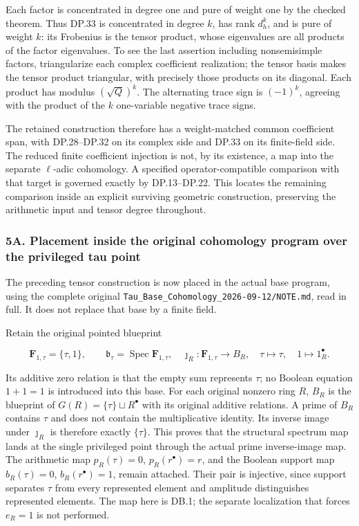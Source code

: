 Each factor is concentrated in degree one and pure of weight one by the checked theorem. Thus DP.33 is concentrated in degree \(k\), has rank \(d_h^k\), and is pure of weight \(k\): its Frobenius is the tensor product, whose eigenvalues are all products of the factor eigenvalues. To see the last assertion including nonsemisimple factors, triangularize each complex coefficient realization; the tensor basis makes the tensor product triangular, with precisely those products on its diagonal. Each product has modulus \((\sqrt Q)^k\). The alternating trace sign is \((-1)^k\), agreeing with the product of the \(k\) one-variable negative trace signs.

The retained construction therefore has a weight-matched common coefficient span, with DP.28--DP.32 on its complex side and DP.33 on its finite-field side. The reduced finite coefficient injection is not, by its existence, a map into the separate \(\ell\)-adic cohomology. A specified operator-compatible comparison with that target is governed exactly by DP.13--DP.22. This locates the remaining comparison inside an explicit surviving geometric construction, preserving the arithmetic input and tensor degree throughout.

\subsubsection{5A. Placement inside the original cohomology program over the privileged tau point}\label{endpoint-purity_review--a.-placement-inside-the-original-cohomology-program-over-the-privileged-tau-point}

The preceding tensor construction is now placed in the actual base program, using the complete original \nolinkurl{Tau_Base_Cohomology_2026-09-12/NOTE.md}, read in full. It does not replace that base by a finite field.

Retain the original pointed blueprint

\[
\mathbf F_{1,\tau}=\{\tau,1\},\qquad
\mathfrak b_\tau=\operatorname{Spec}\mathbf F_{1,\tau},
\quad \jmath_R:\mathbf F_{1,\tau}\to B_R,
\quad \tau\mapsto\tau,\quad1\mapsto1_R^\bullet.
\tag{DB.1}
\]

Its additive zero relation is that the empty sum represents \(\tau\); no Boolean equation \(1+1=1\) is introduced into this base. For each original nonzero ring \(R\), \(B_R\) is the blueprint of \(G(R)=\{\tau\}\sqcup R^\bullet\) with its original additive relations. A prime of \(B_R\) contains \(\tau\) and does not contain the multiplicative identity. Its inverse image under \(\jmath_R\) is therefore exactly \(\{\tau\}\). This proves that the structural spectrum map lands at the single privileged point through the actual prime inverse-image map. The arithmetic map \(p_R(\tau)=0\), \(p_R(r^\bullet)=r\), and the Boolean support map \(b_R(\tau)=0\), \(b_R(r^\bullet)=1\), remain attached. Their pair is injective, since support separates \(\tau\) from every represented element and amplitude distinguishes represented elements. The map here is DB.1; the separate localization that forces \(e_R=1\) is not performed.

